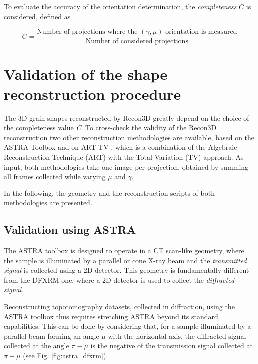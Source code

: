 \documentclass[11pt]{scrartcl}
\begin{document}
To evaluate the accuracy of the orientation determination, the {\emph{completeness}} $C$ is considered, defined as

\begin{equation}
    C = \frac{\text{Number of projections where the } (\gamma, \mu) \text{ orientation is measured}}{\text{Number of considered projections}}
\end{equation}

\section{Validation of the shape reconstruction procedure}
\label{sec:validation}

The {\footnotesize{3D}} grain shapes reconstructed by Recon3D greatly depend on the choice of the completeness value {\emph{C}}. To cross-check the validity of the Recon3D reconstruction two other reconstruction methodologies are available, based on the {\footnotesize{ASTRA}} Toolbox \cite{van2015astra, van2016fast} and on {\footnotesize{ART-TV}} \cite{laroque2008accurate}, which is a combination of the Algebraic Reconstruction Technique ({\footnotesize{ART}}) with the Total Variation ({\footnotesize{TV}}) approach. As input, both methodologies take one image per projection, obtained by summing all frames collected while varying $\mu$ and $\gamma$.

In the following, the geometry and the reconstruction scripts of both methodologies are presented.

\subsection{Validation using ASTRA}

The {\footnotesize{ASTRA}} toolbox \cite{van2015astra, van2016fast} is designed to operate in a {\footnotesize{CT}} scan-like geometry, where the sample is illuminated by a parallel or cone {\footnotesize{X}}-ray beam and the {\emph{transmitted signal}} is collected using a {\footnotesize{2D}} detector. This geometry is fundamentally different from the {\footnotesize{DFXRM}} one, where a {\footnotesize{2D}} detector is used to collect the {\emph{diffracted signal}}.

Reconstructing topotomography datasets, collected in diffraction, using the {\footnotesize{ASTRA}} toolbox thus requires stretching {\footnotesize{ASTRA}} beyond its standard capabilities. This can be done by considering that, for a sample illuminated by a parallel beam forming an angle $\mu$ with the horizontal axis, the diffracted signal collected at the angle $\pi - \mu$ is the negative of the transmission signal collected at $\pi + \mu$ (see Fig. \ref{fig:astra_dfxrm}).
\end{document}
